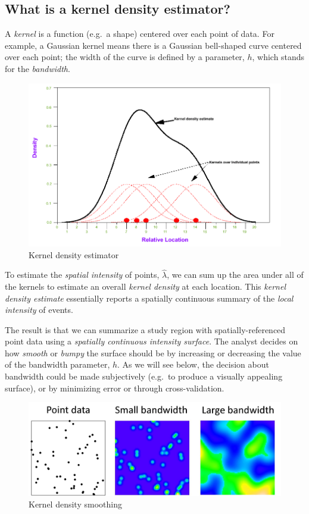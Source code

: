 \documentclass[
]{book}
\begin{document}
\hypertarget{what-is-a-kernel-density-estimator}{%
\subsection{What is a kernel density estimator?}\label{what-is-a-kernel-density-estimator}}

A \emph{kernel} is a function (e.g.~a shape) centered over each point of data. For example, a Gaussian kernel means there is a Gaussian bell-shaped curve centered over each point; the width of the curve is defined by a parameter, \(h\), which stands for the \emph{bandwidth}.

\begin{figure}
\centering
\includegraphics{images/kde2.png}
\caption{\label{fig:unnamed-chunk-126}Kernel density estimator}
\end{figure}

To estimate the \emph{spatial intensity} of points, \(\hat{\lambda}\), we can sum up the area under all of the kernels to estimate an overall \emph{kernel density} at each location. This \emph{kernel density estimate} essentially reports a spatially continuous summary of the \emph{local intensity} of events.

The result is that we can summarize a study region with spatially-referenced point data using a \emph{spatially continuous intensity surface}. The analyst decides on how \emph{smooth} or \emph{bumpy} the surface should be by increasing or decreasing the value of the bandwidth parameter, \(h\). As we will see below, the decision about bandwidth could be made subjectively (e.g.~to produce a visually appealing surface), or by minimizing error or through cross-validation.

\begin{figure}
\centering
\includegraphics{images/kde3.jpg}
\caption{\label{fig:unnamed-chunk-127}Kernel density smoothing}
\end{figure}
\end{document}
